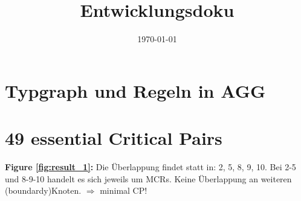 \documentclass[12pt]{article}
\title{Entwicklungsdoku}
\date{\today}
\begin{document}
	\maketitle
	
	
	\section{Typgraph und Regeln in AGG}
	
%	
	
	
	\section{49 essential Critical Pairs}
	
	\textbf{Figure \ref{fig:result_1}:} Die Überlappung findet statt in: 2, 5, 8, 9, 10. Bei 2-5 und 8-9-10 handelt es sich jeweils um MCRs. Keine Überlappung an weiteren (boundardy)Knoten. $\Rightarrow$ minimal CP!
	
\end{document}
